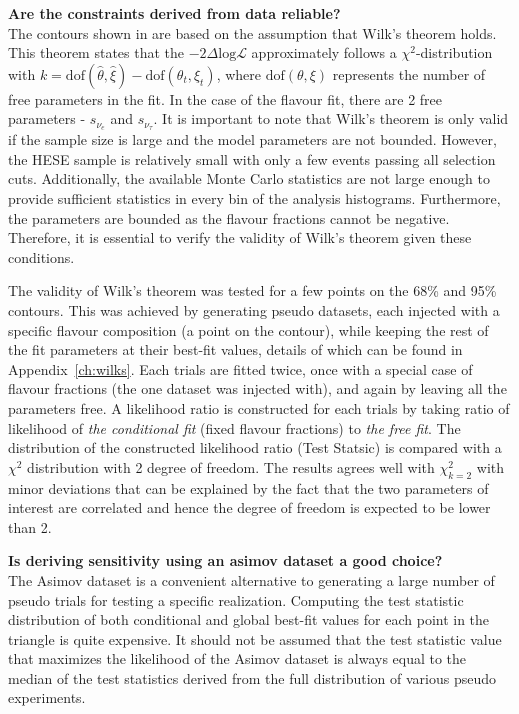 \textbf{Are the constraints derived from data reliable?}\\
The contours shown in  are based on the assumption that Wilk's theorem holds. This theorem states that the $-2\Delta\mathrm{log}\mathcal{L}$ approximately follows a $\chi^2$-distribution with $k = \text{dof}(\hat{\theta}, \hat{\xi}) - \text{dof}(\theta_t, \xi_t)$, where $\text{dof}(\theta, \xi)$ represents the number of free parameters in the fit. In the case of the flavour fit, there are 2 free parameters - $s_{\nu_{e}}$ and $s_{\nu_{\tau}}$. It is important to note that Wilk's theorem is only valid if the sample size is large and the model parameters are not bounded. However, the HESE sample is relatively small with only a few events passing all selection cuts. Additionally, the available Monte Carlo statistics are not large enough to provide sufficient statistics in every bin of the analysis histograms. Furthermore, the parameters are bounded as the flavour fractions cannot be negative. Therefore, it is essential to verify the validity of Wilk's theorem given these conditions. 

The validity of Wilk's theorem was tested for a few points on the 68\% and 95\% contours. This was achieved by generating pseudo datasets, each injected with a specific flavour composition (a point on the contour), while keeping the rest of the fit parameters at their best-fit values, details of which can be found in Appendix~\ref{ch:wilks}. Each trials are fitted twice, once with a special case of flavour fractions (the one dataset was injected with), and again by leaving all the parameters free. A likelihood ratio is constructed for each trials by taking ratio of likelihood of \emph{the conditional fit} (fixed flavour fractions) to \emph{the free fit}. The distribution of the constructed likelihood ratio (Test Statsic) is compared with a $\chi^2$ distribution with 2 degree of freedom. The results agrees well with $\chi_{k=2}^2$ with minor deviations that can be explained by the fact that the two parameters of interest are correlated and hence the degree of freedom is expected to be lower than 2.  
     
\textbf{Is deriving sensitivity using an asimov dataset a good choice?}\\
The Asimov dataset is a convenient alternative to generating a large number of pseudo trials for testing a specific realization. Computing the test statistic distribution of both conditional and global best-fit values for each point in the triangle is quite expensive. It should not be assumed that the test statistic value that maximizes the likelihood of the Asimov dataset is always equal to the median of the test statistics derived from the full distribution of various pseudo experiments. 

